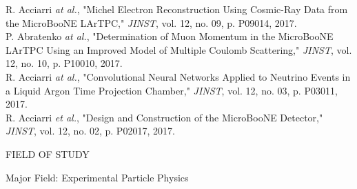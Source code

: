   R. Acciarri \textit{at al.}, "Michel Electron Reconstruction Using Cosmic-Ray Data from the MicroBooNE LArTPC," \textit{JINST}, vol. 12, no. 09, p. P09014, 2017. \\
  P. Abratenko \textit{at al.}, "Determination of Muon Momentum in the MicroBooNE LArTPC Using an Improved Model of Multiple Coulomb Scattering," \textit{JINST}, vol. 12, no. 10, p. P10010, 2017. \\
  R. Acciarri \textit{at al.}, "Convolutional Neural Networks Applied to Neutrino Events in a Liquid Argon Time Projection Chamber," \textit{JINST}, vol. 12, no. 03, p. P03011, 2017. \\
   R. Acciarri \textit{et al.}, "Design and Construction of the MicroBooNE Detector," \textit{JINST}, vol. 12, no. 02, p. P02017, 2017. \\
\begin{center}
FIELD OF STUDY
\end{center}
\begin{flushleft}
Major Field: Experimental Particle Physics
\end{flushleft}

\newpage
